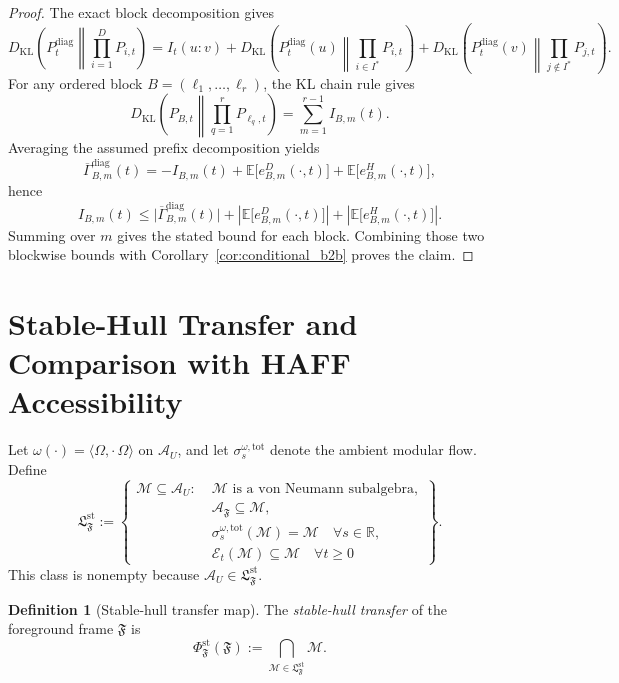 \documentclass[12pt]{article}
\theoremstyle{definition}
\newtheorem{definition}[theorem]{Definition}
\theoremstyle{remark}
\begin{document}
\begin{proof}
The exact block decomposition gives
\[
D_{\mathrm{KL}}\!\left(
P_t^{\mathrm{diag}}
\middle\|
\prod_{i=1}^D P_{i,t}
\right)
=
I_t(u:v)
+
D_{\mathrm{KL}}\!\left(
P_t^{\mathrm{diag}}(u)
\middle\|
\prod_{i\in I^*} P_{i,t}
\right)
+
D_{\mathrm{KL}}\!\left(
P_t^{\mathrm{diag}}(v)
\middle\|
\prod_{j\notin I^*} P_{j,t}
\right).
\]
For any ordered block \(B=(\ell_1,\dots,\ell_r)\), the KL chain rule
gives
\[
D_{\mathrm{KL}}\!\left(
P_{B,t}
\middle\|
\prod_{q=1}^r P_{\ell_q,t}
\right)
=
\sum_{m=1}^{r-1} I_{B,m}(t).
\]
Averaging the assumed prefix decomposition yields
\[
\overline{\Gamma}_{B,m}^{\mathrm{diag}}(t)
=
-I_{B,m}(t)
+
\mathbb E\!\bigl[e_{B,m}^{D}(\cdot,t)\bigr]
+
\mathbb E\!\bigl[e_{B,m}^{H}(\cdot,t)\bigr],
\]
hence
\[
I_{B,m}(t)
\le
\bigl|\overline{\Gamma}_{B,m}^{\mathrm{diag}}(t)\bigr|
+
\left|
\mathbb E\!\bigl[e_{B,m}^{D}(\cdot,t)\bigr]
\right|
+
\left|
\mathbb E\!\bigl[e_{B,m}^{H}(\cdot,t)\bigr]
\right|.
\]
Summing over \(m\) gives the stated bound for each block. Combining
those two blockwise bounds with
Corollary~\ref{cor:conditional_b2b} proves the claim.
\end{proof}

\section{Stable-Hull Transfer and Comparison with HAFF Accessibility}\label{sec:haff}

Let \(\omega(\cdot)=\langle\Omega,\cdot\,\Omega\rangle\) on
\(\mathcal A_U\), and let \(\sigma_s^{\omega,\mathrm{tot}}\) denote the
ambient modular flow. Define
\[
\mathfrak L_{\mathfrak F}^{\mathrm{st}}
:=
\left\{
\begin{aligned}
\mathcal M\subseteq \mathcal A_U:\;&
\mathcal M \text{ is a von Neumann subalgebra},\\
&
\mathcal A_{\mathfrak F}\subseteq \mathcal M,\\
&
\sigma_s^{\omega,\mathrm{tot}}(\mathcal M)=\mathcal M
\quad \forall s\in\mathbb R,\\
&
\mathcal E_t(\mathcal M)\subseteq \mathcal M
\quad \forall t\ge 0
\end{aligned}
\right\}.
\]
This class is nonempty because \(\mathcal A_U\in \mathfrak L_{\mathfrak F}^{\mathrm{st}}\).

\begin{definition}[Stable-hull transfer map]\label{def:stablehull}
The \emph{stable-hull transfer} of the foreground frame
\(\mathfrak F\) is
\[
\Phi_{\mathfrak F}^{\mathrm{st}}(\mathfrak F)
:=
\bigcap_{\mathcal M\in \mathfrak L_{\mathfrak F}^{\mathrm{st}}}\mathcal M.
\]
\end{definition}
\end{document}
